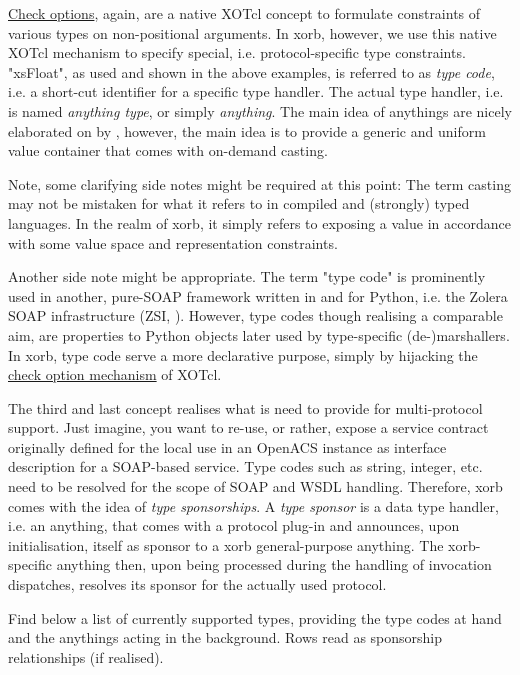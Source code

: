 \href{http://media.wu-wien.ac.at/doc/tutorial.html#non-pos-args}{Check options}, again, are a native XOTcl concept to formulate constraints of various types on non-positional arguments. In xorb, however, we use this native XOTcl mechanism to specify special, i.e. protocol-specific type constraints. "xsFloat", as used and shown in the above examples, is referred to as \emph{type code}, i.e. a short-cut identifier for a specific type handler. The actual type handler, i.e.  is named \emph{anything type}, or simply \emph{anything}. The main idea of anythings are nicely elaborated on by \cite{sommerlad:1998,maetzel:1996}, however, the main idea is to provide a generic and uniform value container that comes with on-demand casting. 
\begin{hints}
\item Note, some clarifying side notes might be required at this point: The term casting may not be mistaken for what it refers to in compiled and (strongly) typed languages. In the realm of xorb, it simply refers to exposing a value in accordance with some value space and representation constraints.
\item Another side note might be appropriate. The term "type code" is prominently used in another, pure-SOAP framework written in and for Python, i.e. the Zolera SOAP infrastructure (ZSI, \cite{zsi:2007}). However, type codes though realising a comparable aim, are properties to Python objects later used by type-specific (de-)marshallers. In xorb, type code serve a more declarative purpose, simply by hijacking the \href{http://media.wu-wien.ac.at/doc/tutorial.html#non-pos-args}{check option mechanism} of XOTcl.
\end{hints}
The third and last concept realises what is need to provide for multi-protocol support. Just imagine, you want to re-use, or rather, expose a service contract originally defined for the local use in an OpenACS instance as interface description for a SOAP-based service. Type codes such as string, integer, etc. need to be resolved for the scope of SOAP and WSDL handling. Therefore, xorb comes with the idea of \emph{type sponsorships}. A \emph{type sponsor} is a data type handler, i.e. an anything, that comes with a protocol plug-in and announces, upon initialisation, itself as sponsor to a xorb general-purpose anything. The xorb-specific anything then, upon being processed during the handling of invocation dispatches, resolves its sponsor for the actually used protocol. 

Find below a list of currently supported types, providing the type codes at hand and the anythings acting in the background. Rows read as sponsorship relationships (if realised).


